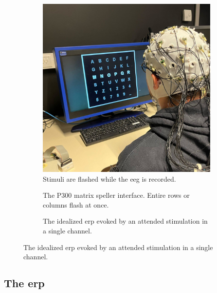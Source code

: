 \begin{figure}[t]
  \centering
  \begin{subfigure}[t]{.45\textwidth}
  \includegraphics[width=\textwidth, height=\textwidth]{figures/bci/illustration}
    \caption{Stimuli are flashed while the \acs{eeg} is recorded.}
  \end{subfigure}\hfill%
  \begin{subfigure}[t]{.45\textwidth}
    
    \caption{The P300 matrix speller interface. Entire rows or columns flash at once.}
  \end{subfigure}

  \begin{subfigure}[t]{.45\textwidth}
    
    \caption{The idealized \ac{erp} evoked by an attended stimulation in a single
    channel.}
  \end{subfigure}%
\end{figure}

\subsection{The \acl{erp}}
\label{sec:bci/oddball/erp}

